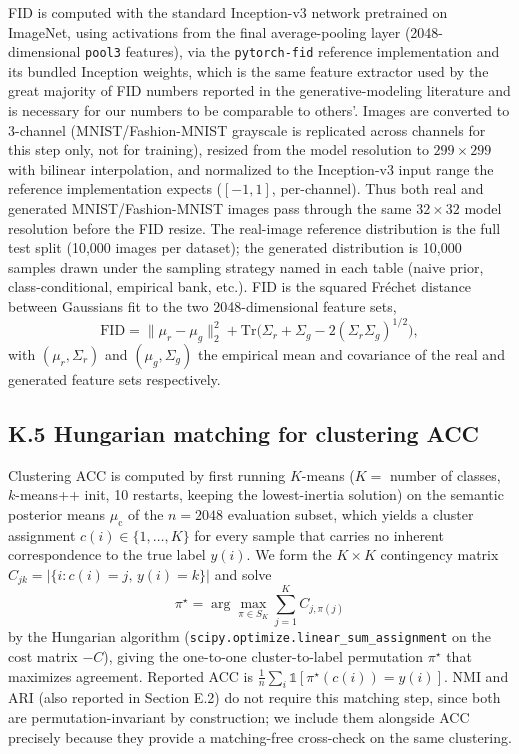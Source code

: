 \documentclass[letterpaper]{article}
\newcommand{\muc}{\mu_{\mathrm{c}}}
\begin{document}
FID is computed with the standard Inception-v3 network
\citep{szegedy2016rethinking} pretrained on ImageNet, using activations from
the final average-pooling layer (2048-dimensional \texttt{pool3} features),
via the \texttt{pytorch-fid} reference implementation and its bundled
Inception weights, which is the same feature extractor used by the great
majority of FID numbers reported in the generative-modeling literature and is
necessary for our numbers to be comparable to others'. Images are converted
to 3-channel (MNIST/Fashion-MNIST grayscale is replicated across channels for
this step only, not for training), resized from the model resolution to
$299\times299$ with bilinear interpolation, and normalized to the
Inception-v3 input range the reference implementation expects
($[-1,1]$, per-channel). Thus both real and generated MNIST/Fashion-MNIST
images pass through the same $32\times32$ model resolution before the FID
resize. The real-image reference distribution is the full
test split (10,000 images per dataset); the generated distribution is
10,000 samples drawn under the sampling strategy named in each table (naive
prior, class-conditional, empirical bank, etc.). FID is the squared
Fr\'echet distance between Gaussians fit to the two 2048-dimensional feature
sets,
\[
\mathrm{FID}=\|\mu_r-\mu_g\|_2^2+\mathrm{Tr}\bigl(\Sigma_r+\Sigma_g-2(\Sigma_r\Sigma_g)^{1/2}\bigr),
\]
with $(\mu_r,\Sigma_r)$ and $(\mu_g,\Sigma_g)$ the empirical mean and
covariance of the real and generated feature sets respectively.

\subsection{K.5 Hungarian matching for clustering ACC}

Clustering ACC is computed by first running $K$-means ($K{=}$ number of
classes, $k$-means++ init, 10 restarts, keeping the lowest-inertia solution)
on the semantic posterior means $\muc$ of the $n{=}2048$ evaluation subset,
which yields a cluster assignment $c(i)\in\{1,\dots,K\}$ for every sample
that carries no inherent correspondence to the true label $y(i)$. We form the
$K\times K$ contingency matrix $C_{jk}=|\{i:c(i){=}j,\,y(i){=}k\}|$ and solve
\[
\pi^\star=\arg\max_{\pi\in S_K}\sum_{j=1}^K C_{j,\pi(j)}
\]
by the Hungarian algorithm (\texttt{scipy.optimize.linear\_sum\_assignment}
on the cost matrix $-C$), giving the one-to-one cluster-to-label permutation
$\pi^\star$ that maximizes agreement. Reported ACC is
$\frac1n\sum_i \mathbb{1}[\pi^\star(c(i)){=}y(i)]$. NMI and ARI (also
reported in Section E.2) do not require this matching step, since both are
permutation-invariant by construction; we include them alongside ACC
precisely because they provide a matching-free cross-check on the same
clustering.
\end{document}
